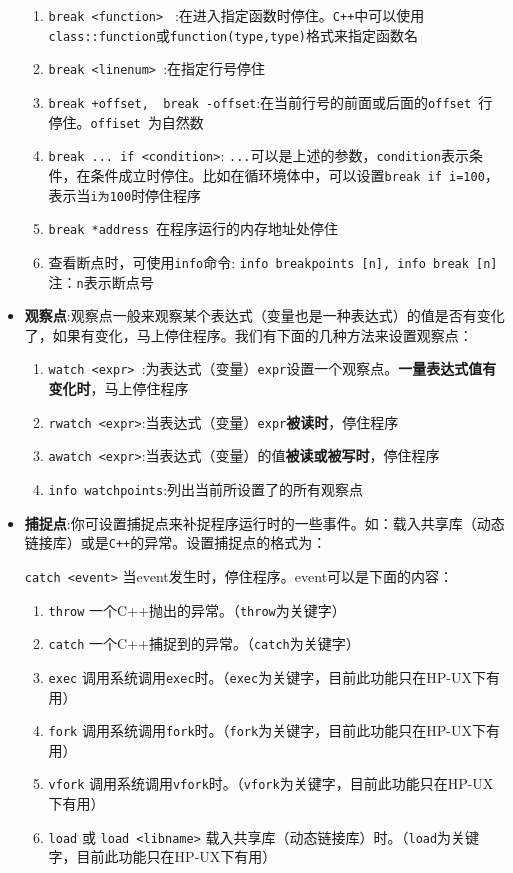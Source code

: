 \documentclass[UTF8,a4paper,12pt]{ctexbook} %
\begin{document}
\begin{itemize}[itemindent = 1em]
						 	\begin{enumerate}
						 		\item \verb|break <function> | :在进入指定函数时停住。\verb|C++|中可以使用\verb|class::function|或\verb|function(type,type)|格式来指定函数名
						 		\item \verb|break <linenum> |:在指定行号停住
						 		\item \verb|break +offset, 	break -offset|:在当前行号的前面或后面的\verb|offset |行停住。\verb|offiset |为自然数
						 		\item \verb|break ... if <condition>|: \verb|...|可以是上述的参数，\verb|condition|表示条件，在条件成立时停住。比如在循环境体中，可以设置\verb|break if i=100|，表示当\verb|i为100|时停住程序
						 		\item \verb|break *address |在程序运行的内存地址处停住
						 		\item 查看断点时，可使用\verb|info|命令: \verb|info breakpoints [n], info break [n]|注：\verb|n|表示断点号
						 	\end{enumerate}
					 	\item \textbf{观察点}:观察点一般来观察某个表达式（变量也是一种表达式）的值是否有变化了，如果有变化，马上停住程序。我们有下面的几种方法来设置观察点：
						 	\begin{enumerate}
						 		\item \verb|watch <expr> |:为表达式（变量）\verb|expr|设置一个观察点。\textbf{一量表达式值有变化时}，马上停住程序
						 		\item \verb|rwatch <expr>|:当表达式（变量）\verb|expr|\textbf{被读时}，停住程序
						 		\item \verb|awatch <expr>|:当表达式（变量）的值\textbf{被读或被写时}，停住程序
						 		\item \verb|info watchpoints|:列出当前所设置了的所有观察点
						 	\end{enumerate}
					 	\item \textbf{捕捉点}:你可设置捕捉点来补捉程序运行时的一些事件。如：载入共享库（动态链接库）或是\verb|C++|的异常。设置捕捉点的格式为：
					 	
						 	\verb|catch <event>| 当event发生时，停住程序。event可以是下面的内容：
						 	
						 	\begin{enumerate}
						 		\item \verb|throw| 一个C++抛出的异常。（\verb|throw|为关键字）
						 		\item \verb|catch| 一个C++捕捉到的异常。（\verb|catch|为关键字）
						 		\item \verb|exec| 调用系统调用\verb|exec|时。（\verb|exec|为关键字，目前此功能只在HP-UX下有用）
						 		\item \verb|fork| 调用系统调用\verb|fork|时。（\verb|fork|为关键字，目前此功能只在HP-UX下有用）
						 		\item \verb|vfork| 调用系统调用\verb|vfork|时。（\verb|vfork|为关键字，目前此功能只在HP-UX下有用）
						 		\item \verb|load| 或 \verb|load <libname>| 载入共享库（动态链接库）时。（\verb|load|为关键字，目前此功能只在HP-UX下有用）
						 		

\end{enumerate}
\end{itemize}
\end{document}

